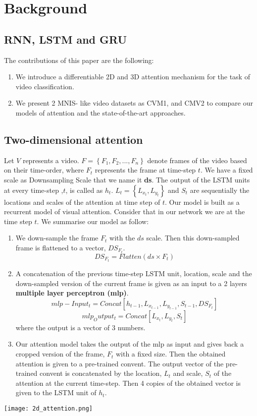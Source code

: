 \documentclass{article} %
\begin{document}
\section{Background}
\subsection{RNN, LSTM and GRU}
The contributions of this paper are the following:
\begin{enumerate}
\item We introduce a differentiable 2D and 3D attention mechanism for the task of video classification.
\item We present 2 MNIS- like video datasets as CVM1, and CMV2 to compare our models of attention and the state-of-the-art approaches.
\end{enumerate}
\subsection{Two-dimensional attention}
Let $V$ represents a video. $F=\left \{ F_{1}, F_{2}, ..., F_{n} \right \}$ denote frames of the video based on their time-order, where $F_{t}$ represents the frame at time-step $t$. We have a fixed scale as Downsampling Scale that we name it \textbf{ds}. The output of the LSTM units at every time-step ,$t$, is called as $h_{t}$. $L_{t}=\left \{ L_{x_{t}},L_{y_{t}} \right \}$ and $S_{t}$ are sequentially the locations and scales of the attention at time step of $t$.
Our model is built as a recurrent model of visual attention. Consider that in our network we are at the time step $t$. We summarise our model as follow:
\begin{enumerate}
\item We down-sample the frame $F_{t}$ with the $ds$ scale. Then this down-sampled frame is flattened to a vector, $DS_{F_{t}}$.
\begin{equation}
DS_{F_{t}}=Flatten(ds\times F_{t})
\end{equation} 
\item A concatenation of the previous time-step LSTM unit, location, scale and the down-sampled version of the current frame is given as an input to a 2 layers \textbf{multiple layer perceptron (mlp)}.
\begin{equation}
mlp-Input_{t}=Concat\left [h_{t-1}, L_{x_{t-1}},L_{y_{t-1}}, S_{t-1}, DS_{F_{t}}\right]
\end{equation} 
\begin{equation}
mlp_Output_{t}=Concat\left [ L_{x_{t}}, L_{y_{t}}, S_{t}\right]
\end{equation}
where the output is a vector of 3 numbers.
\item Our attention model takes the output of the mlp as input and gives back a cropped version of the frame, $F_{t}$ with a fixed size. Then the obtained attention is given to a pre-trained convent. The output vector of the pre-trained convent is concatenated by the location, $L_{t}$ and scale, $S_{t}$ of the attention at the current time-step. Then 4 copies of the obtained vector is given to the LSTM unit of $h_{t}$.
\end{enumerate}
\texttt{[image: 2d\_attention.png]}
\end{document}
